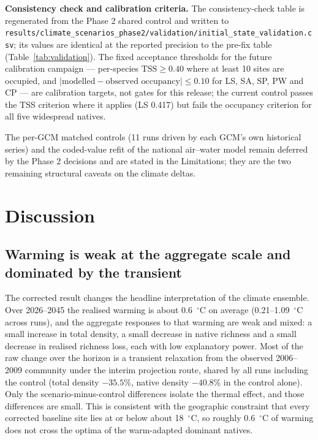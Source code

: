 \documentclass[11pt,a4paper]{article}
\begin{document}
\textbf{Consistency check and calibration criteria.} The consistency-check table is regenerated from the Phase 2 shared control and written to \texttt{results/climate\_scenarios\_phase2/validation/initial\_state\_validation.csv}; its values are identical at the reported precision to the pre-fix table (Table~\ref{tab:validation}). The fixed acceptance thresholds for the future calibration campaign --- per-species $\mathrm{TSS}\ge0.40$ where at least 10 sites are occupied, and $|\text{modelled}-\text{observed occupancy}|\le0.10$ for LS, SA, SP, PW and CP --- are calibration targets, not gates for this release; the current control passes the TSS criterion where it applies (LS 0.417) but fails the occupancy criterion for all five widespread natives.

The per-GCM matched controls (11 runs driven by each GCM's own historical series) and the coded-value refit of the national air--water model remain deferred by the Phase 2 decisions and are stated in the Limitations; they are the two remaining structural caveats on the climate deltas.

\section{Discussion}

\subsection{Warming is weak at the aggregate scale and dominated by the transient}

The corrected result changes the headline interpretation of the climate ensemble. Over 2026--2045 the realised warming is about 0.6~$^\circ$C on average (0.21--1.09~$^\circ$C across runs), and the aggregate responses to that warming are weak and mixed: a small increase in total density, a small decrease in native richness and a small decrease in realised richness loss, each with low explanatory power. Most of the raw change over the horizon is a transient relaxation from the observed 2006--2009 community under the interim projection route, shared by all runs including the control (total density $-35.5$\%, native density $-40.8$\% in the control alone). Only the scenario-minus-control differences isolate the thermal effect, and those differences are small. This is consistent with the geographic constraint that every corrected baseline site lies at or below about 18~$^\circ$C, so roughly 0.6~$^\circ$C of warming does not cross the optima of the warm-adapted dominant natives.
\end{document}

